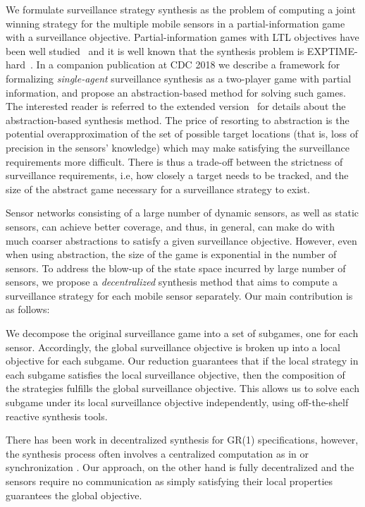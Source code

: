 We formulate surveillance strategy synthesis as the problem of computing a joint winning strategy for the multiple mobile sensors in a partial-information game with a surveillance objective. Partial-information games with LTL objectives have been well studied~\cite{DoyenR11,Chatterjee2013} and it is well known that the synthesis problem is EXPTIME-hard~\cite{Reif84,BerwangerD08}. In a companion publication at CDC 2018 we describe a framework for formalizing \emph{single-agent} surveillance synthesis as a two-player game with partial information, and propose an abstraction-based method for solving such games. The interested reader is referred to the extended version~\cite{arxiv} for details about the abstraction-based synthesis method. The price of resorting to abstraction is the potential overapproximation of the set of possible target locations (that is, loss of precision in the sensors' knowledge) which may make satisfying the surveillance requirements more difficult. There is thus a trade-off between the strictness of surveillance requirements, i.e, how closely a target needs to be tracked, and the size of the abstract game necessary for a surveillance strategy to exist. 

Sensor networks consisting of a large number of dynamic sensors, as well as static sensors, can achieve better coverage, and thus, in general, can make do with much coarser abstractions to satisfy a given surveillance objective. However, even when using abstraction, the size of the game is exponential in the number of sensors. To address the blow-up of the state space incurred by large number of sensors, we propose a \emph{decentralized} synthesis method that aims to compute a surveillance strategy for each mobile sensor separately. Our main contribution is as follows:

 We decompose the original surveillance game into a set of subgames, one for each sensor. Accordingly, the global surveillance objective is  broken up into a local objective for each subgame. Our reduction guarantees that if the local strategy in each subgame satisfies the local surveillance objective, then the composition of the strategies fulfills the global surveillance objective. This allows us to solve each subgame under its local surveillance objective independently, using off-the-shelf reactive synthesis tools. 

 There has been work in decentralized synthesis for GR(1) specifications, however, the synthesis process often involves a centralized computation as in \cite{Kloetzer06} or synchronization \cite{Salar17,Kloetzer11}. Our approach, on the other hand is fully  decentralized and the sensors require no communication as simply satisfying their local properties guarantees the global objective.

